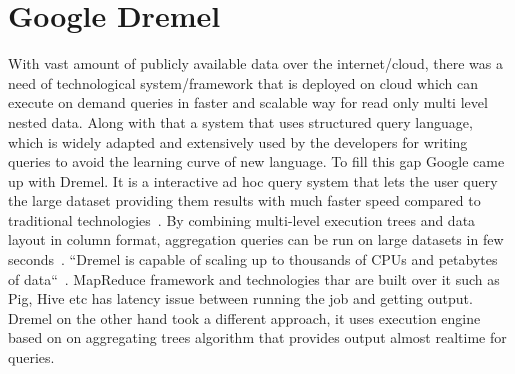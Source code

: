 \section{Google Dremel}


With vast amount of publicly available data over the internet/cloud, 
there was a need of technological system/framework that is deployed on 
cloud which can execute on demand queries in faster and scalable way 
for read only multi level nested data. Along with that a system that 
uses structured query language, which is widely adapted and extensively 
used by the developers for writing queries to avoid the learning curve of 
new language. To fill this gap Google came up with Dremel. It is a 
interactive ad hoc query system that lets the user query the large 
dataset providing them results with much faster speed compared to 
traditional technologies~\cite{hid-sp18-523-www-dremel}. By combining 
multi-level execution trees and data layout in column format, aggregation 
queries can be run on large datasets in few 
seconds~\cite{hid-sp18-523-www-dremel}. 
``Dremel is capable of scaling up to thousands of CPUs and petabytes of 
data``~\cite{hid-sp18-523-www-dremel}.
MapReduce framework and technologies thar are built over it such as Pig, Hive 
etc has latency issue between running the job and getting output. 
Dremel on the other hand took a different approach, it uses execution engine
based on on aggregating trees algorithm that provides output almost realtime 
for queries.
